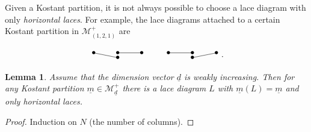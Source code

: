\documentclass[a4paper]{amsart}
\newcommand{\CM}{\mathcal{M}}
\newcommand{\um}{\underline{m}}
\newcommand{\ud}{\underline{d}}
\newtheorem{lemma}[thm]{Lemma}
\theoremstyle{plain}
\begin{document}
Given a Kostant partition, it is not always possible to choose a lace diagram with only {\em horizontal laces}. For example, the lace diagrams attached to a certain Kostant partition in $\CM^+_{(1,2,1)}$ are

\begin{equation} \label{eqn:smalllaces}
\begin{tikzpicture}[baseline=-5]
 \node at (0,0)  {$\bullet$};
 \node at (1,0)  {$\bullet$};
 \node at (1,-.2)  {$\bullet$};
 \node at (2,0)  {$\bullet$};
  \draw (0,0) -- (1,-.2);
  \draw (1,0)--(2,0);
\end{tikzpicture}
\quad\quad
\begin{tikzpicture}[baseline=-5]
 \node at (0,0)  {$\bullet$};
 \node at (1,0)  {$\bullet$};
 \node at (1,-.2)  {$\bullet$};
 \node at (2,0)  {$\bullet$};
  \draw (0,0) -- (1,0);
  \draw (1,-.2)--(2,0);
\end{tikzpicture}.
\end{equation}

\begin{lemma} \label{lem:horiz_rep}
Assume that the dimension vector $\ud$ is weakly increasing. Then for any Kostant partition $\um\in \CM^+_{\ud}$ there is a lace diagram $L$ with $\um(L)=\um$ and only horizontal laces.
\end{lemma}

\begin{proof} Induction on $N$ (the number of columns).\end{proof}
\end{document}
